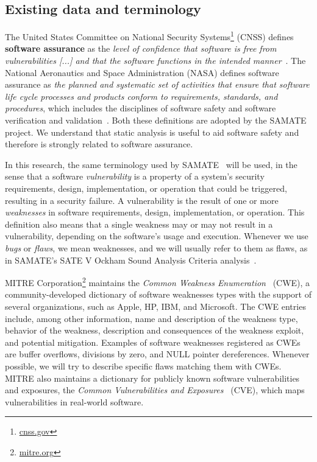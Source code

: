 \subsection{Existing data and terminology}
\label{sub:terminology}

The United States Committee on National Security
Systems\footnote{\url{cnss.gov}} (CNSS) defines \textbf{software assurance} as
the \textit{level of confidence that software is free from vulnerabilities [...]
and that the software functions in the intended
manner}~\cite{instruction20034009}. The National Aeronautics and Space
Administration (NASA) defines software assurance as \textit{the planned and
systematic set of activities that ensure that software life cycle processes and
products conform to requirements, standards, and procedures}, which includes
the disciplines of software safety and software verification and
validation~\cite{nasastd8739}. Both these definitions are adopted by the SAMATE
project. We understand that static analysis is useful to aid software safety
and therefore is strongly related to software assurance.

In this research, the same terminology used by
SAMATE~\cite{black_counting_2011} will be used, in the sense that a software
\textit{vulnerability} is a property of a system's security requirements,
design, implementation, or operation that could be triggered, resulting in a
security failure. A vulnerability is the result of one or more
\textit{weaknesses} in software requirements, design, implementation, or
operation. This definition also means that a single weakness may or may not result in a
vulnerability, depending on the software's usage and execution. Whenever we use
\textit{bugs} or \textit{flaws}, we mean weaknesses, and we will usually refer
to them as flaws, as in SAMATE's SATE V Ockham Sound Analysis Criteria
analysis~\cite{black_sate_2016}.

MITRE Corporation\footnote{\url{mitre.org}} maintains the \textit{Common Weakness
Enumeration}~\cite{cwe_page} (CWE), a community-developed dictionary of
software weaknesses types with the support of several organizations, such as Apple,
HP, IBM, and Microsoft. The CWE entries include, among other information, name
and description of the weakness type, behavior of the weakness, description and
consequences of the weakness exploit, and potential mitigation. Examples of
software weaknesses registered as CWEs are buffer overflows, divisions by zero,
and NULL pointer dereferences. Whenever possible, we will try to describe
specific flaws matching them with CWEs. MITRE also maintains a dictionary for
publicly known software vulnerabilities and exposures, the \textit{Common
Vulnerabilities and Exposures}~\cite{cve_page} (CVE), which maps vulnerabilities
in real-world software.

